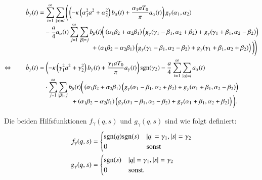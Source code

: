\begin{align}
\dot{b}_\gamma(t)
&=
\sum_{i = 1}^{\infty}
\sum_{|\alpha| = i}
\Bigg(
\left(
-
\kappa
\left(\alpha_1^2 a^2 + \alpha_2^2\right)
b_{\alpha}(t)
+
\frac{\alpha_1 a T_0}{\pi}
a_{\alpha}(t)
\right)
g_\gamma(\alpha_1, \alpha_2) 
\nonumber
\\[-1ex]
&\phantom{={}}
-
\frac{a}{4}
a_{\alpha}(t)
\sum_{j = 1}^{\infty}
\sum_{|\beta| = j}
b_{\beta}(t)
\bigg(
\left(\alpha_1 \beta_2 + \alpha_2 \beta_1 \right)
\left(
g_\gamma(\gamma_1 - \beta_1, \alpha_2 + \beta_2)
+
g_\gamma(\gamma_1 + \beta_1, \alpha_2 - \beta_2)
\right) \nonumber
\\[-2ex]
&\phantom{=-aat\sum\sum...{}ccc}
+
\left(\alpha_1 \beta_2 - \alpha_2 \beta_1 \right)
\left(
g_\gamma(\gamma_1 - \beta_1, \alpha_2 - \beta_2)
+
g_\gamma(\gamma_1 + \beta_1, \alpha_2 + \beta_2)
\right)
\bigg)
\Bigg) \nonumber
\\
\Leftrightarrow \qquad
\dot{b}_\gamma(t)
&=
\left(
-
\kappa
\left(\gamma_1^2 a^2 + \gamma_2^2\right)
b_{\gamma}(t)
+
\frac{\gamma_1 a T_0}{\pi}
a_{\gamma}(t)
\right)
\sgn(\gamma_2)
-
\frac{a}{4}
\sum_{i = 1}^{\infty}
\sum_{|\alpha| = i}
a_{\alpha}(t)
\nonumber
\\[-1ex]
&\phantom{={}}
\cdot
\sum_{j = 1}^{\infty}
\sum_{|\beta| = j}
b_{\beta}(t)
\bigg(
\left(\alpha_1 \beta_2 + \alpha_2 \beta_1 \right)
\left(
g_\gamma(\alpha_1 - \beta_1, \alpha_2 + \beta_2)
+
g_\gamma(\alpha_1 + \beta_1, \alpha_2 - \beta_2)
\right)
\nonumber
\\[-2ex]
&\phantom{=-aat\sum..}
+
\left(\alpha_1 \beta_2 - \alpha_2 \beta_1 \right)
\left(
g_\gamma(\alpha_1 - \beta_1, \alpha_2 - \beta_2)
+
g_\gamma(\alpha_1 + \beta_1, \alpha_2 + \beta_2)
\right)
\bigg).
\label{equation:lorenz2:dotb}
\end{align}

Die beiden Hilfsfunktionen $f_\gamma(q, s)$ und $g_\gamma(q, s)$ sind wie folgt 
definiert:
\begin{align*}
f_\gamma(q, s)
&=
\begin{cases}
\sgn(q)\sgn(s) & |q| = \gamma_1, |s| = \gamma_2 \\
0 & \text{sonst}
\end{cases}
\\
g_\gamma(q, s)
&=
\begin{cases}
\sgn(s) & |q| = \gamma_1, |s| = \gamma_2 \\
0 & \text{sonst}.
\end{cases}
\end{align*}
